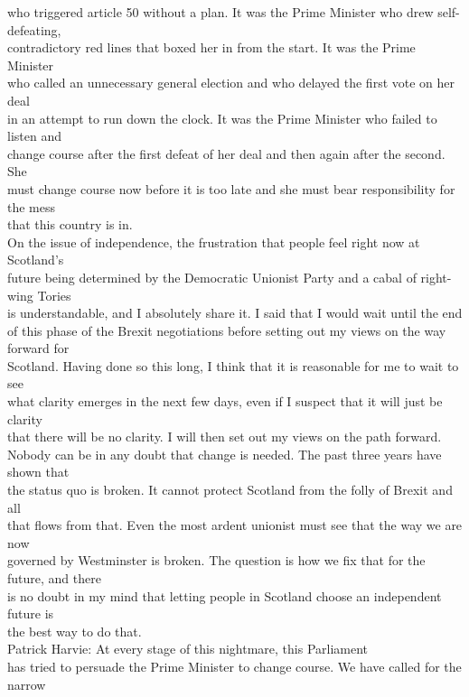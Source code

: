 \documentclass{article}
\begin{document}
\begin{description}
{who triggered article 50 without a plan. It was the Prime Minister who drew self-defeating,\\
contradictory red lines that boxed her in from the start. It was the Prime Minister\\
who called an unnecessary general election and who delayed the first vote on her deal\\
in an attempt to run down the clock. It was the Prime Minister who failed to listen and\\
change course after the first defeat of her deal and then again after the second. She\\
must change course now before it is too late and she must bear responsibility for the mess\\
that this country is in.\\
On the issue of independence, the frustration that people feel right now at Scotland’s\\
future being determined by the Democratic Unionist Party and a cabal of right-wing Tories\\
is understandable, and I absolutely share it. I said that I would wait until the end\\
of this phase of the Brexit negotiations before setting out my views on the way forward for\\
Scotland. Having done so this long, I think that it is reasonable for me to wait to see\\
what clarity emerges in the next few days, even if I suspect that it will just be clarity\\
that there will be no clarity. I will then set out my views on the path forward.\\
Nobody can be in any doubt that change is needed. The past three years have shown that\\
the status quo is broken. It cannot protect Scotland from the folly of Brexit and all\\
that flows from that. Even the most ardent unionist must see that the way we are now\\
governed by Westminster is broken. The question is how we fix that for the future, and there\\
is no doubt in my mind that letting people in Scotland choose an independent future is\\
the best way to do that.\\
Patrick Harvie: At every stage of this nightmare, this Parliament\\
has tried to persuade the Prime Minister to change course. We have called for the narrow\\
}
\end{description}
\end{document}
